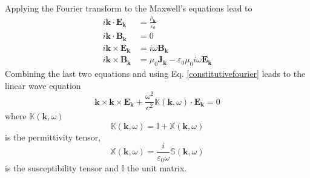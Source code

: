 \documentclass[a4paper,12pt]{article}%
\begin{document}
Applying the Fourier transform to the Maxwell's equations lead to%
\begin{align}
i\mathbf{k}\cdot\mathbf{E}_{\mathbf{k}}  &  =\frac{\rho_{\mathbf{k}}%
}{\varepsilon_{0}}\\
i\mathbf{k}\cdot\mathbf{B}_{\mathbf{k}}  &  =0\\
i\mathbf{k}\times\mathbf{E}_{\mathbf{k}}  &  =i\omega\mathbf{B}_{\mathbf{k}}\\
i\mathbf{k}\times\mathbf{B}_{\mathbf{k}}  &  =\mu_{0}\mathbf{J}_{\mathbf{k}%
}-\varepsilon_{0}\mu_{0}i\omega\mathbf{E}_{\mathbf{k}}%
\end{align}
Combining the last two equations and using Eq. \ref{constitutivefourier} leads
to the linear wave equation%
\begin{equation}
\mathbf{k}\times\mathbf{k}\times\mathbf{E}_{\mathbf{k}}+\frac{\omega^{2}%
}{c^{2}}\mathbb{K}\left(  \mathbf{k},\omega\right)  \cdot\mathbf{E}%
_{\mathbf{k}}=0
\end{equation}
where $\mathbb{K}\left(  \mathbf{k},\omega\right)  $
\begin{equation}
\mathbb{K}\left(  \mathbf{k},\omega\right)  \mathbb{=I+X}\left(
\mathbf{k},\omega\right)  \label{permittivity}%
\end{equation}
is the permittivity tensor,
\begin{equation}
\mathbb{X}\left(  \mathbf{k},\omega\right)  \mathbb{=}\frac{i}{\varepsilon
_{0}\omega}\mathbb{S}\left(  \mathbf{k},\omega\right)  \label{susceptibility}%
\end{equation}
is the susceptibility tensor and $\mathbb{I}$ the unit matrix.
\end{document}
